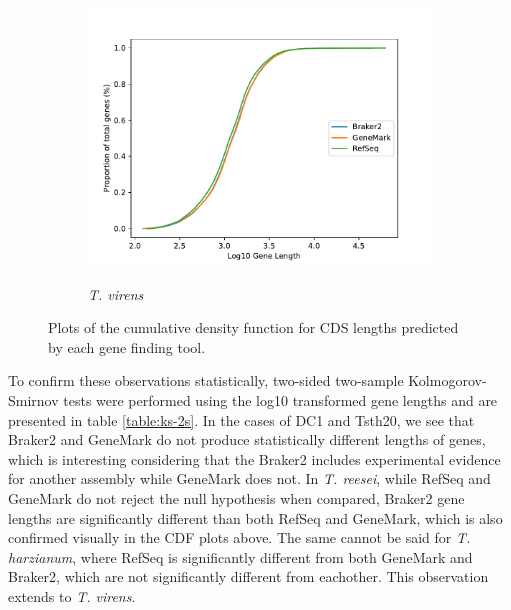 \begin{figure}[p!]
  \ContinuedFloat
  \centering
  \begin{subfigure}{0.7\textwidth}
    \includegraphics[width=\textwidth]{figures/t-virens-cdf-lengths-log.pdf}
    \label{fig:tvirens-lengths}
    \caption{\textit{T. virens}}
  \end{subfigure}
  \caption[Cumulative Density Function of Gene Lengths]{Plots of the
    cumulative density function for CDS lengths predicted by each gene
    finding tool.}
  \label{fig:cdf-lengths}
\end{figure}

To confirm these observations statistically, two-sided two-sample
Kolmogorov-Smirnov tests were performed using the log10 transformed
gene lengths and are presented in table \ref{table:ks-2s}. In the
cases of DC1 and Tsth20, we see that Braker2 and GeneMark do not
produce statistically different lengths of genes, which is interesting
considering that the Braker2 includes experimental evidence for
another assembly while GeneMark does not. In \textit{T. reesei}, while
RefSeq and GeneMark do not reject the null hypothesis when compared,
Braker2 gene lengths are significantly different than both RefSeq and
GeneMark, which is also confirmed visually in the CDF plots above. The
same cannot be said for \textit{T. harzianum}, where RefSeq is
significantly different from both GeneMark and Braker2, which are not
significantly different from eachother. This observation extends to
\textit{T. virens}.

